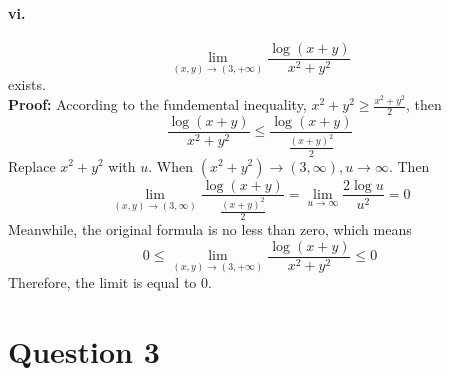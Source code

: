 \documentclass[11pt, a4paper]{article}
\begin{document}
\paragraph{vi.}
$$\lim_{(x, y) \to (3, +\infty)} \frac{\log(x + y)}{x ^ 2 + y ^ 2}$$ exists. \\
\textbf{Proof:} According to the fundemental inequality, $x ^ 2 + y ^ 2 \geq \frac{x ^ 2 + y ^ 2}{2}$, then
$$\frac{\log(x + y)}{x ^ 2 + y ^ 2} \leq \frac{\log(x + y)}{\frac{(x + y) ^ 2}{2}}$$
Replace $x ^ 2 + y ^ 2$ with $u$. When $(x ^ 2 + y ^ 2) \to (3, \infty), u \to \infty$. Then 
$$\lim_{(x, y) \to (3, \infty)} \frac{\log(x + y)}{\frac{(x + y) ^ 2}{2}} = \lim_{u \to \infty} \frac{2\log u}{u ^ 2} = 0$$
Meanwhile, the original formula is no less than zero, which means
$$0 \leq \lim_{(x, y) \to (3, +\infty)} \frac{\log(x + y)}{x ^ 2 + y ^ 2} \leq 0$$
Therefore, the limit is equal to 0.

\section*{Question 3}
\end{document}
